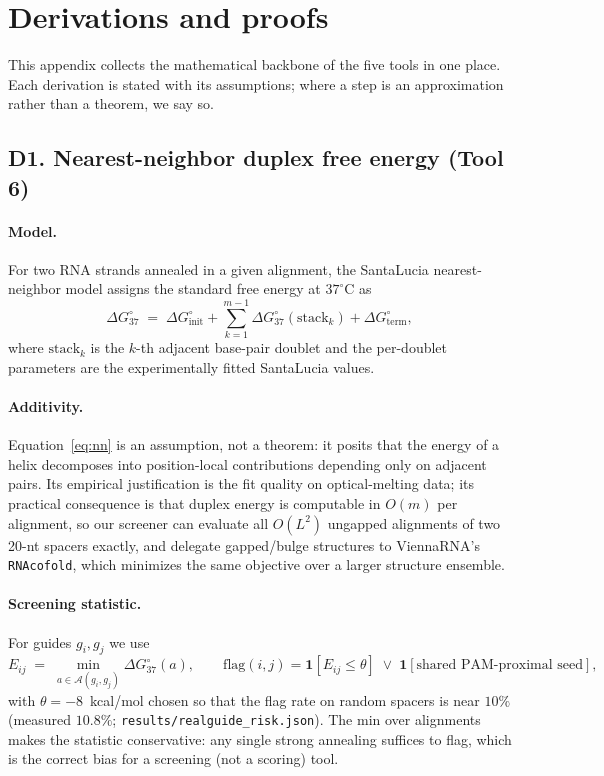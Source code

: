 \section{Derivations and proofs}
This appendix collects the mathematical backbone of the five tools in one
place. Each derivation is stated with its assumptions; where a step is an
approximation rather than a theorem, we say so.

\subsection{D1. Nearest-neighbor duplex free energy (Tool 6)}
\paragraph{Model.} For two RNA strands annealed in a given alignment, the
SantaLucia nearest-neighbor model assigns the standard free energy at
$37^{\circ}$C as
\begin{equation}
\Delta G^{\circ}_{37} \;=\; \Delta G^{\circ}_{\text{init}}
+ \sum_{k=1}^{m-1} \Delta G^{\circ}_{37}\!\left(\text{stack}_k\right)
+ \Delta G^{\circ}_{\text{term}},
\label{eq:nn}
\end{equation}
where $\text{stack}_k$ is the $k$-th adjacent base-pair doublet and the
per-doublet parameters are the experimentally fitted SantaLucia values.
\paragraph{Additivity.} Equation~\eqref{eq:nn} is an assumption, not a
theorem: it posits that the energy of a helix decomposes into
position-local contributions depending only on adjacent pairs. Its
empirical justification is the fit quality on optical-melting data; its
practical consequence is that duplex energy is computable in $O(m)$ per
alignment, so our screener can evaluate all $O(L^2)$ ungapped alignments
of two 20-nt spacers exactly, and delegate gapped/bulge structures to
ViennaRNA's \texttt{RNAcofold}, which minimizes the same objective over a
larger structure ensemble.
\paragraph{Screening statistic.} For guides $g_i, g_j$ we use
\begin{equation}
E_{ij} \;=\; \min_{a \in \mathcal{A}(g_i, g_j)} \Delta G^{\circ}_{37}(a),
\qquad
\text{flag}(i,j) = \mathbf{1}\!\left[E_{ij} \le \theta\right]
\;\vee\; \mathbf{1}\!\left[\text{shared PAM-proximal seed}\right],
\label{eq:flag}
\end{equation}
with $\theta = -8$~kcal/mol chosen so that the flag rate on random
spacers is near $10\%$ (measured $10.8\%$;
\texttt{results/realguide\_risk.json}). The min over alignments makes the
statistic conservative: any single strong annealing suffices to flag,
which is the correct bias for a screening (not a scoring) tool.

